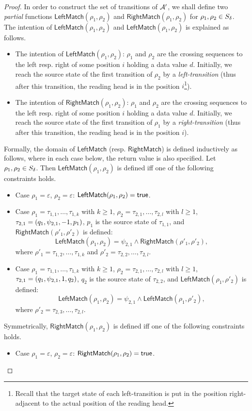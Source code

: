 \begin{proof}
\newcommand\lmatch{\mathsf{LeftMatch}}
\newcommand\rmatch{\mathsf{RightMatch}}

In order to construct the set of transitions of $\mathcal{A}'$, we shall define two \emph{partial} functions $\lmatch(\rho_1, \rho_2)$ and $\rmatch(\rho_1, \rho_2)$ for $\rho_1, \rho_2 \in S_{\delta}$. 
The intention of $\lmatch(\rho_1, \rho_2)$ and $\lmatch(\rho_1, \rho_2)$ is explained as follows.
\begin{itemize}
\item The intention of $\lmatch(\rho_1, \rho_2)$: $\rho_1$ and $\rho_2$ are the crossing sequences to the left resp. right of some position $i$ holding a data value $d$. Initially, we reach the source state of the first transition of $\rho_2$ by a \emph{left-transition} (thus after this transition, the reading head is in the position $i$\footnote{Recall that the target state of each left-transition is put in the position right-adjacent to the actual position of the reading head.}).
%
\item The intention of $\rmatch(\rho_1, \rho_2)$:  $\rho_1$ and $\rho_2$ are the crossing sequences to the left resp. right of some position $i$ holding a data value $d$. Initially, we reach the source state of the first transition of $\rho_1$ %
by a \emph{right-transition} (thus after this transition, the reading head is in the position $i$).
\end{itemize}
%
Formally, the domain of $\lmatch$ (resp. $\rmatch$) is defined inductively as follows, where in each case below, the return value is also specified. Let $\rho_1, \rho_2 \in S_{\delta}$. Then $\lmatch(\rho_1, \rho_2)$ is defined iff one of the following constraints holds.
\begin{itemize}
\item Case $\rho_1 = \varepsilon$, $\rho_2 = \varepsilon$: $\lmatch(\rho_1, \rho_2) = \ltrue$.
%
\item Case $\rho_1 =  \tau_{1,1}, \ldots, \tau_{1,k}$ with $k \ge 1$, $\rho_2 = \tau_{2,1}, \ldots, \tau_{2,l}$ with $l \ge 1$, $\tau_{2,1} = (q_1, \psi_{2,1}, -1, p_1)$, $p_1$ is the source state of $\tau_{1,1}$, and $\rmatch(\rho'_1, \rho'_2)$ is defined:  
$$\lmatch(\rho_1, \rho_2) = \psi_{2,1} \wedge \rmatch(\rho'_1, \rho'_2),$$ 
where $\rho'_1 = \tau_{1,2}, \ldots, \tau_{1,k}$ and $\rho'_2 = \tau_{2,2}, \ldots, \tau_{2,l}$.
%
\item Case $\rho_1 =  \tau_{1,1}, \ldots, \tau_{1,k}$ with $k \ge 1$, $\rho_2 = \tau_{2,1}, \ldots, \tau_{2,l}$ with $l \ge 1$, $\tau_{2,1} = (q_1, \psi_{2,1}, 1, q_2)$, $q_2$ is the source state of $\tau_{2,2}$, and $\lmatch(\rho_1, \rho'_2)$ is defined:  
$$\lmatch(\rho_1, \rho_2) = \psi_{2,1} \wedge \lmatch(\rho_1, \rho'_2),$$ 
where $\rho'_2 = \tau_{2,3}, \ldots, \tau_{2,l}$.
%
\end{itemize} 
%
Symmetrically, $\rmatch(\rho_1, \rho_2)$ is defined iff one of the following constraints holds.
\begin{itemize}
\item Case $\rho_1 = \varepsilon$, $\rho_2 = \varepsilon$: $\rmatch(\rho_1, \rho_2) = \ltrue$.


\end{itemize}
\end{proof}

